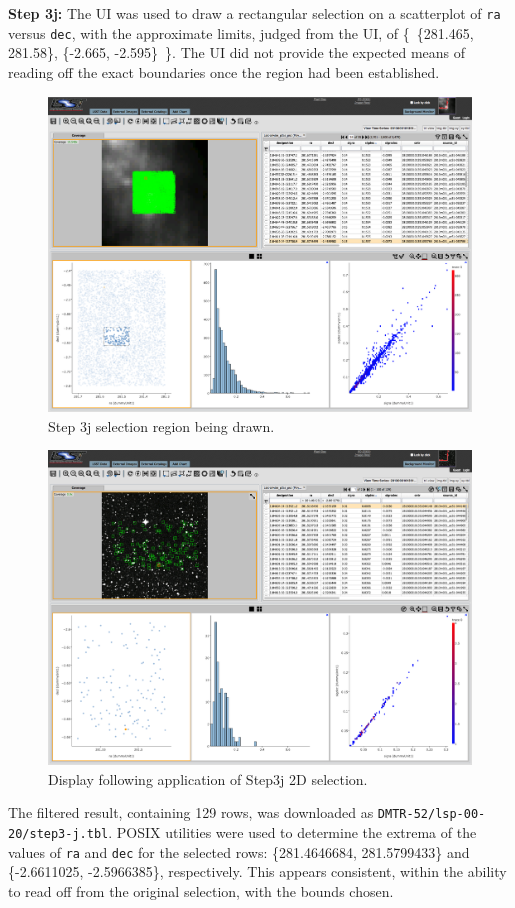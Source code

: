 \textbf{Step 3j:} The UI was used to draw a rectangular selection on a scatterplot of \verb|ra| versus \verb|dec|,
with the approximate limits, judged from the UI, of \{~\{281.465, 281.58\}, \{-2.665, -2.595\}~\}.
The UI did not provide the expected means of reading off the exact boundaries once the region had been established.

\begin{figure}
  \includegraphics[width=\linewidth]{lsp-00-20/step3-j.png}
  \caption{Step 3j selection region being drawn.}
  \label{fig:lsp-00-20-rect-selecting}
\end{figure}

\begin{figure}
  \includegraphics[width=\linewidth]{lsp-00-20/step3-j2.png}
  \caption{Display following application of Step3j 2D selection.}
  \label{fig:lsp-00-20-rect-selected}
\end{figure}

The filtered result, containing 129 rows, was downloaded as \verb|DMTR-52/lsp-00-20/step3-j.tbl|.
POSIX utilities were used to determine the extrema of the values of \verb|ra| and \verb|dec| for the selected rows:
\{281.4646684, 281.5799433\} and \{-2.6611025, -2.5966385\}, respectively.
This appears consistent, within the ability to read off from the original selection, with the bounds chosen.
